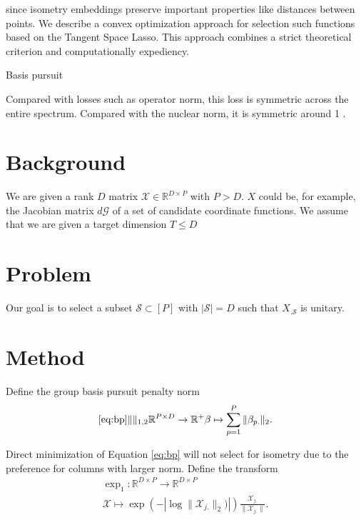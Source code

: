 \documentclass[a4paper,11pt]{article}
\begin{document}
since isometry embeddings preserve important properties like distances between points.
We describe a convex optimization approach for selection such functions based on the Tangent Space Lasso.
This approach combines a strict theoretical criterion and computationally expediency.

Basis pursuit \cite{Chen2001-hh} 

Compared with losses such as operator norm, this loss is symmetric across the entire spectrum.  Compared with the nuclear norm, it is symmetric around 1 \cite{Fazel2001ARM}. %

\section{Background}

We are given a rank $D$ matrix $\mathcal X \in \mathbb R^{D \times P}$ with $P > D$.
$X$ could be, for example, the Jacobian matrix $d\mathcal G$ of a set of candidate coordinate functions.
We assume that we are given a target dimension $T \leq D$

\section{Problem}

Our goal is to select a subset $\mathcal S \subset [P]$ with $|\mathcal S| = D$ such that $X_{. \mathcal S}$ is unitary.

\section{Method}

Define the group basis pursuit penalty norm %
\begin{align}
\ref{eq:bp}
\|\|_{1,2} \mathbb R^{P \times D} \to \mathbb R^+
\beta \mapsto  \sum_{p=1}^P  \|\beta_{p.}\|_2.
\end{align}


Direct minimization of Equation \ref{eq:bp} will not select for isometry due to the preference for columns with larger norm.
Define the transform
\begin{align}
\exp_1: \mathbb R^{D \times P} \to \mathbb R^{D \times P} \\ 
\mathcal X \mapsto \exp (- | \log \|{\mathcal X }_{j.}\|_2)|) \frac{{\mathcal X }_{j.}}{\|{\mathcal X }_{j.}\|}.
\end{align}
\end{document}
